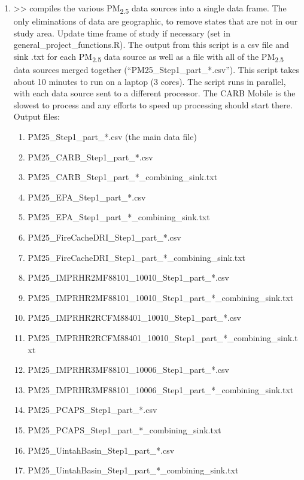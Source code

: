 \begin{enumerate}[nolistsep]
\item {} >> compiles the various PM\textsubscript{2.5} data sources into a single data frame. The only eliminations of data are geographic, to remove states that are not in our study area. Update time frame of study if necessary (set in general\_project\_functions.R). The output from this script is a csv file and sink .txt for each  PM\textsubscript{2.5} data source as well as a file with all of the PM\textsubscript{2.5} data sources merged together (``PM25\_Step1\_part\_*.csv''). This script takes about 10 minutes to run on a laptop (3 cores). The script runs in parallel, with each data source sent to a different processor. The CARB Mobile is the slowest to process and any efforts to speed up processing should start there. Output files: %
\begin{enumerate}[nolistsep]
\item PM25\_Step1\_part\_*.csv (the main data file)
\item PM25\_CARB\_Step1\_part\_*.csv
\item PM25\_CARB\_Step1\_part\_*\_combining\_sink.txt
\item PM25\_EPA\_Step1\_part\_*.csv
\item PM25\_EPA\_Step1\_part\_*\_combining\_sink.txt
\item PM25\_FireCacheDRI\_Step1\_part\_*.csv
\item PM25\_FireCacheDRI\_Step1\_part\_*\_combining\_sink.txt
\item PM25\_IMPRHR2MF88101\_10010\_Step1\_part\_*.csv
\item PM25\_IMPRHR2MF88101\_10010\_Step1\_part\_*\_combining\_sink.txt
\item PM25\_IMPRHR2RCFM88401\_10010\_Step1\_part\_*.csv
\item PM25\_IMPRHR2RCFM88401\_10010\_Step1\_part\_*\_combining\_sink.txt
\item PM25\_IMPRHR3MF88101\_10006\_Step1\_part\_*.csv
\item PM25\_IMPRHR3MF88101\_10006\_Step1\_part\_*\_combining\_sink.txt
\item PM25\_PCAPS\_Step1\_part\_*.csv
\item PM25\_PCAPS\_Step1\_part\_*\_combining\_sink.txt
\item PM25\_UintahBasin\_Step1\_part\_*.csv
\item PM25\_UintahBasin\_Step1\_part\_*\_combining\_sink.txt

\end{enumerate}
\end{enumerate}

